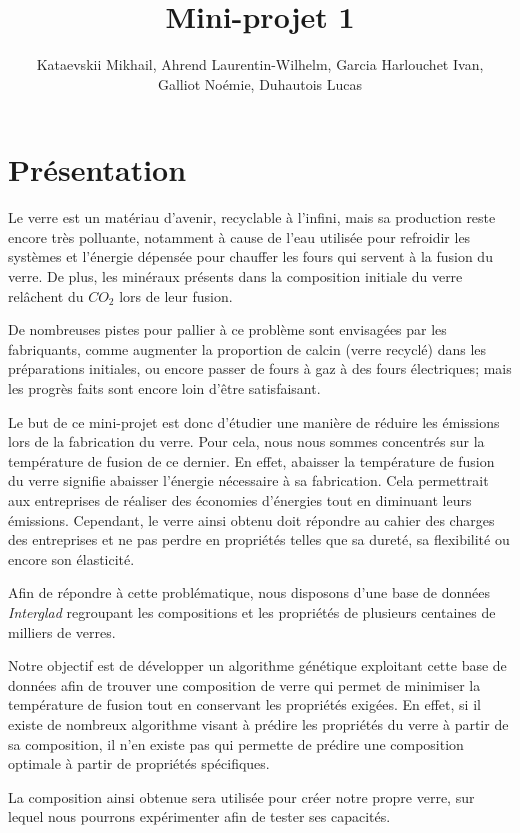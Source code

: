\documentclass{article}
\title{Mini-projet 1}
\author{Kataevskii Mikhail, Ahrend Laurentin-Wilhelm, Garcia Harlouchet Ivan, \\ Galliot Noémie, Duhautois Lucas}
\begin{document}
\maketitle

\section{Présentation}

Le verre est un matériau d'avenir, recyclable à l'infini, mais sa production reste encore très polluante, notamment à cause de l'eau utilisée pour refroidir les systèmes et l'énergie dépensée pour chauffer les fours qui servent à la fusion du verre. De plus, les minéraux présents dans la composition initiale du verre relâchent du $CO_2$ lors de leur fusion.

De nombreuses pistes pour pallier à ce problème sont envisagées par les fabriquants, comme augmenter la proportion de calcin (verre recyclé) dans les préparations initiales, ou encore passer de fours à gaz à des fours électriques; mais les progrès faits sont encore loin d'être satisfaisant.

Le but de ce mini-projet est donc d'étudier une manière de réduire les émissions lors de la fabrication du verre. Pour cela, nous nous sommes concentrés sur la température de fusion de ce dernier. En effet, abaisser la température de fusion du verre signifie abaisser l'énergie nécessaire à sa fabrication. Cela permettrait aux entreprises de réaliser des économies d'énergies tout en diminuant leurs émissions. Cependant, le verre ainsi obtenu doit répondre au cahier des charges des entreprises et ne pas perdre en propriétés telles que sa dureté, sa flexibilité ou encore son élasticité.

Afin de répondre à cette problématique, nous disposons d'une base de données \textit{Interglad} regroupant les compositions et les propriétés de plusieurs centaines de milliers de verres.

Notre objectif est de développer un algorithme génétique exploitant cette base de données afin de trouver une composition de verre qui permet de minimiser la température de fusion tout en conservant les propriétés exigées. En effet, si il existe de nombreux algorithme visant à prédire les propriétés du verre à partir de sa composition, il n'en existe pas qui permette de prédire une composition optimale à partir de propriétés spécifiques.

La composition ainsi obtenue sera utilisée pour créer notre propre verre, sur lequel nous pourrons expérimenter afin de tester ses capacités.
\end{document}
